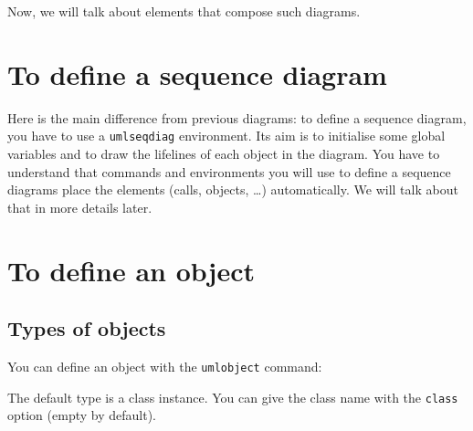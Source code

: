 \documentclass[a4paper,11pt]{report}
\begin{document}
Now, we will talk about elements that compose such diagrams.

\section{To define a sequence diagram}\label{s.seqdiag}

Here is the main difference from previous diagrams: to define a sequence diagram, you have to use a {\tt umlseqdiag} environment.
Its aim is to initialise some global variables and to draw the lifelines of each object in the diagram. You have to understand that commands and environments you will use to define a sequence diagrams place the elements (calls, objects, \ldots ) automatically. We will talk about that in more details later.

\section{To define an object}\label{s.objs}

\subsection{Types of objects}\label{ss.obj}

You can define an object with the {\tt umlobject} command:

\medskip

\begin{minipage}{0.5\textwidth}
	
\end{minipage}
\begin{minipage}{0.5\textwidth}
	\begin{center}
	\end{center}
\end{minipage}

\medskip

The default type is a class instance. You can give the class name with the {\tt class} option (empty by default).

\medskip

\begin{minipage}{0.5\textwidth}
	
\end{minipage}
\begin{minipage}{0.5\textwidth}
	\begin{center}
	\end{center}
\end{minipage}
\end{document}
